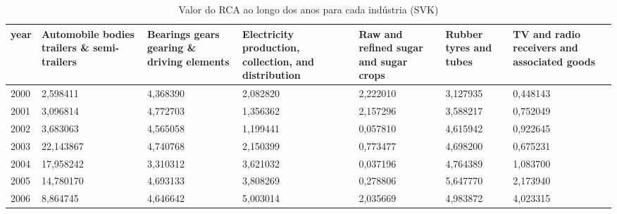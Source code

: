 \begin{table}
\centering
\caption{Valor do RCA ao longo dos anos para cada indústria (SVK)}
\begin{tabular}{p{1cm}p{2cm}p{2cm}p{2cm}p{2cm}p{2cm}p{2cm}}
\toprule
 year &  Automobile bodies trailers \& semi-trailers &  Bearings gears gearing \& driving elements &  Electricity production, collection, and distribution &  Raw and refined sugar and sugar crops &  Rubber tyres and tubes &  TV and radio receivers and associated goods \\
\midrule
 2000 &                                    2,598411 &                                   4,368390 &                                           2,082820 &                               2,222010 &                3,127935 &                                     0,448143 \\
 2001 &                                    3,096814 &                                   4,772703 &                                           1,356362 &                               2,157296 &                3,588217 &                                     0,752049 \\
 2002 &                                    3,683063 &                                   4,565058 &                                           1,199441 &                               0,057810 &                4,615942 &                                     0,922645 \\
 2003 &                                   22,143867 &                                   4,740768 &                                           2,150399 &                               0,773477 &                4,698200 &                                     0,675231 \\
 2004 &                                   17,958242 &                                   3,310312 &                                           3,621032 &                               0,037196 &                4,764389 &                                     1,083700 \\
 2005 &                                   14,780170 &                                   4,693133 &                                           3,808269 &                               0,278806 &                5,647770 &                                     2,173940 \\
 2006 &                                    8,864745 &                                   4,646642 &                                           5,003014 &                               2,035669 &                4,983872 &                                     4,023315 \\

\end{tabular}
\end{table}
